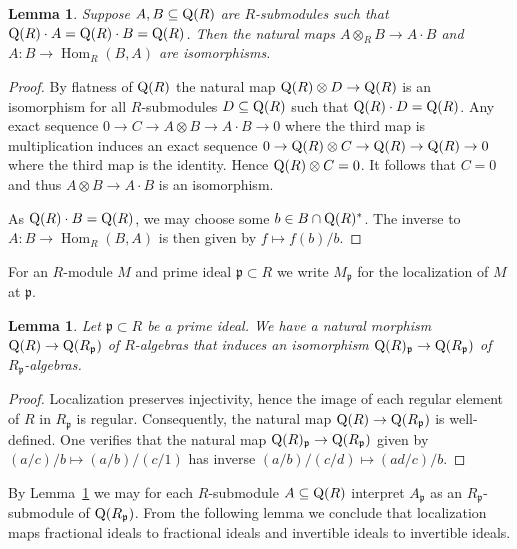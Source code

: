 \documentclass{amsart}
\theoremstyle{plain}
\newtheorem{lemma}[theorem]{Lemma}
\theoremstyle{definition}
\DeclareMathOperator{\Hom}{Hom}
\newcommand{\tensor}{\otimes}
\newcommand{\p}{\ensuremath{\mathfrak{p}}}
\newcommand{\fp}{\ensuremath{\mathfrak{p}}}
\begin{document}
\begin{lemma}\label{lem:tensor_hom}
Suppose \(A,B\subseteq\textup{Q}(R)\) are \(R\)-submodules such that \(\textup{Q}(R)\cdot A=\textup{Q}(R)\cdot B=\textup{Q}(R)\).
Then the natural maps \(A\tensor_R B\to A\cdot B\) and \(A:B\to\Hom_R(B,A)\) are isomorphisms.
\end{lemma}
\begin{proof}
By flatness of \(\textup{Q}(R)\) the natural map \(\textup{Q}(R)\tensor D\to\textup{Q}(R)\) is an isomorphism for all \(R\)-submodules \(D\subseteq\textup{Q}(R)\) such that \(\textup{Q}(R)\cdot D = \textup{Q}(R)\). 
Any exact sequence \(0\to C\to A\tensor B \to A\cdot B \to 0\) where the third map is multiplication induces an exact sequence \(0\to\textup{Q}(R)\tensor C \to \textup{Q}(R) \to \textup{Q}(R)\to 0\) where the third map is the identity.
Hence \(\textup{Q}(R)\tensor C=0\). It follows that \(C=0\) and thus \(A\tensor B\to A \cdot B\) is an isomorphism.

As \(\textup{Q}(R)\cdot B=\textup{Q}(R)\), we may choose some \(b\in B\cap \textup{Q}(R)^*\). The inverse to \(A:B\to\Hom_R(B,A)\) is then given by \(f\mapsto f(b)/b\).
\end{proof}

For an \(R\)-module \(M\) and prime ideal \(\fp\subset R\) we write \(M_\fp\) for the localization of \(M\) at \(\fp\).

\begin{lemma}\label{lem:localize_fractional_ideal}
Let \(\fp\subset R\) be a prime ideal. We have a natural morphism \(\textup{Q}(R)\to\textup{Q}(R_\fp)\) of \(R\)-algebras that induces an isomorphism \(\textup{Q}(R)_\fp \to \textup{Q}(R_\fp)\) of \(R_\fp\)-algebras.
\end{lemma}
\begin{proof}
Localization preserves injectivity, hence the image of each regular element of \(R\) in \(R_\p\) is regular.
Consequently, the natural map \(\textup{Q}(R)\to\textup{Q}(R_\fp)\) is well-defined. One verifies that the natural map \(\textup{Q}(R)_\fp\to\textup{Q}(R_\fp)\) given by \((a/c)/b\mapsto (a/b)/(c/1)\) has inverse \((a/b)/(c/d)\mapsto (ad/c)/b\).
\end{proof}

By Lemma~\ref{lem:localize_fractional_ideal} we may for each \(R\)-submodule \(A\subseteq\textup{Q}(R)\) interpret \(A_\fp\) as an \(R_\fp\)-submodule of \(\textup{Q}(R_\fp)\).
From the following lemma we conclude that localization maps fractional ideals to fractional ideals and invertible ideals to invertible ideals.
\end{document}
